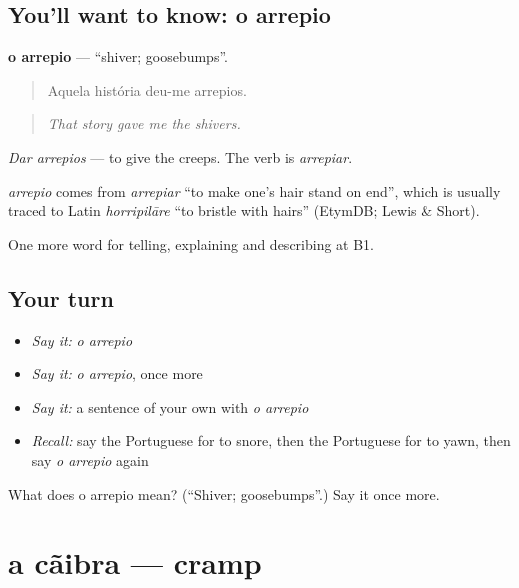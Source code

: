 \subsection*{You'll want to know: o arrepio}
\textbf{o arrepio} — \textquotedblleft{}shiver; goosebumps\textquotedblright{}.

\begin{quote}
Aquela história deu-me arrepios.
\end{quote}

\begin{quote}
\emph{That story gave me the shivers.}
\end{quote}

\emph{Dar arrepios} — to give the creeps. The verb is \emph{arrepiar}.

\begin{cousinweb}
\emph{arrepio} comes from \emph{arrepiar} \textquotedblleft{}to make one's hair stand on end\textquotedblright{}, which is usually traced to Latin \emph{horripilāre} \textquotedblleft{}to bristle with hairs\textquotedblright{} (EtymDB; Lewis \& Short).
\end{cousinweb}

\begin{grammarlens}[title={What you've built}]
One more word for telling, explaining and describing at B1.
\end{grammarlens}

\subsection*{Your turn}
\begin{itemize}
\raggedright
  \item \emph{Say it:} \emph{o arrepio}
  \item \emph{Say it:} \emph{o arrepio}, once more
  \item \emph{Say it:} a sentence of your own with \emph{o arrepio}
  \item \emph{Recall:} say the Portuguese for to snore, then the Portuguese for to yawn, then say \emph{o arrepio} again
\end{itemize}

\begin{tcolorbox}[breakable,colback=teal!4,colframe=teal!35!black,title={Before you move on}]
What does o arrepio mean? (\textquotedblleft{}Shiver; goosebumps\textquotedblright{}.) Say it once more.
\end{tcolorbox}
\section[a cãibra]{a cãibra — cramp}

